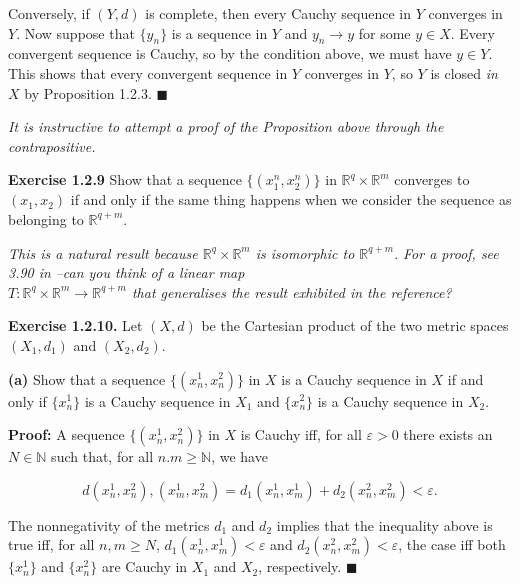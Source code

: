 \documentclass{article}
\begin{document}
Conversely, if $(Y,d)$ is complete, then every Cauchy sequence in $Y$ converges in $Y$. Now suppose that $\{y_n\}$ is a sequence in $Y$ and $y_n\to y$ for some $y\in X$. Every convergent sequence is Cauchy, so by the condition above, we must have $y\in Y$. This shows that every convergent sequence in $Y$ converges in $Y$, so $Y$ is closed \textit{in} $X$ by Proposition 1.2.3. $\blacksquare$ 
\begin{tcolorbox}[opacitybacktitle=0.25, colback=yellow!20!white,colframe=blue!70!green,title={Remark:}]
\textit{It is instructive to attempt a proof of the Proposition above through the contrapositive.}
\end{tcolorbox}

\begin{tcolorbox}
    \textbf{Exercise 1.2.9} Show that a sequence $\{(x_1^n,x_2^n)\}$ in $\mathbb{R}^q\times \mathbb{R}^m$ converges to $(x_1,x_2)$ if and only if the same thing happens when we consider the sequence as belonging to $\mathbb{R}^{q+m}$.
\end{tcolorbox}

\begin{tcolorbox}[opacitybacktitle=0.25, colback=yellow!20!white,colframe=blue!70!green,title={Remark:}]
\textit{This is a natural result because $\mathbb{R}^q\times \mathbb{R}^m$ is isomorphic to $\mathbb{R}^{q+m}.$ For a proof, see 3.90 in} \cite{Axler}\textit{--can you think of a linear map\\ $T:\mathbb{R}^q\times \mathbb{R}^m\to \mathbb{R}^{q+m}$ that generalises the result exhibited in the reference? }
\end{tcolorbox}
\begin{tcolorbox}
\textbf{Exercise 1.2.10.} Let $(X,d)$ be the Cartesian product of the two metric spaces $(X_1,d_1)$ and $(X_2,d_2)$. 

\textbf{(a)} Show that a sequence $\{(x_n^1,x_n^2)\}$ in $X$ is a Cauchy sequence in $X$ if and only if $\{x_n^1\}$ is a Cauchy sequence in $X_1$ and $\{x_n^2\}$ is a Cauchy sequence in $X_2$. 
\end{tcolorbox}
\textbf{Proof:} A sequence $\{(x_n^1,x_n^2)\}$ in $X$ is Cauchy iff, for all $\varepsilon >0$ there exists an $N\in \mathbb{N}$ such that, for all $n.m\geq \mathbb{N}$, we have

\begin{equation*}
    d(x_n^1,x_n^2),(x_m^1,x_m^2)=d_1(x_n^1,x_m^1)+d_2(x_n^2,x_m^2)<\varepsilon.
\end{equation*}

The nonnegativity of the metrics $d_1$ and $d_2$ implies that the inequality above is true iff, for all $n,m\geq N$, $d_1(x_n^1,x_m^1)<\varepsilon$ and $d_2(x_n^2,x_m^2)<\varepsilon$, the case iff both $\{x_n^1\}$ and $\{x_n^2\}$ are Cauchy in $X_1$ and $X_2$, respectively. $\blacksquare$
\end{document}
